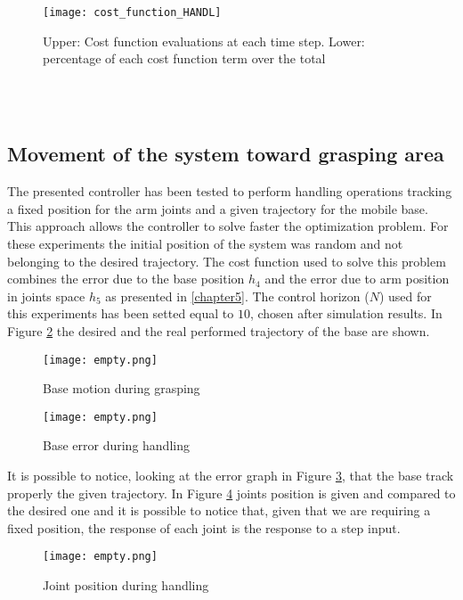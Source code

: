 \begin{figure}%
	\centering
	\texttt{[image: cost\_function\_HANDL]}
	\caption{Upper: Cost function evaluations at each time step. Lower: percentage of each cost function term over the total}
	\label{cost_function_HANDL}
\end{figure}
\\\\
\subsection{Movement of the system toward grasping area}

The presented controller has been tested to perform handling operations tracking a fixed position for the arm joints and a given trajectory for the mobile base. This approach allows the controller to solve faster the optimization problem. For these experiments the initial position of the system was random and not belonging to the desired trajectory. The cost function used to solve this problem combines the error due to the base position $h_4$ and the error due to arm position in joints space $h_5$ as presented in \ref{chapter5}. The control horizon ($N$) used for this experiments has been setted equal to $10$, chosen after simulation results. In Figure \ref{hand_real1} the desired and the real performed trajectory of the base are shown.

	\begin{figure}[h!]
	\centering
	\texttt{[image: empty.png]}
	\caption{Base motion during grasping}
	\label{hand_real1}
	\end{figure}  

	\begin{figure}[h!]
	\centering
	\texttt{[image: empty.png]}
	\caption{Base error during handling}
	\label{err_hand_1}
	\end{figure}  

It is possible to notice, looking at the error graph in Figure \ref{err_hand_1}, that the base track properly the given trajectory. In Figure \ref{joint_pos_handl} joints position is given and compared to the desired one and it is possible to notice that, given that we are requiring a fixed position, the response of each joint is the response to a step input. 

	\begin{figure}[h!]
	\centering
	\texttt{[image: empty.png]}
	\caption{Joint position during handling}
	\label{joint_pos_handl}
	\end{figure}  




